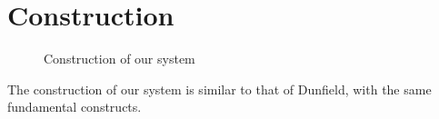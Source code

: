 \documentclass{llncs}
\begin{document}
\section{Construction}
\begin{figure}

\label{fig:cons}
\caption{Construction of our system}
\end{figure}

The construction of our system is similar to that of Dunfield, with the same fundamental constructs.

\begin{figure}

\end{figure}
\begin{figure}

\end{figure}
\begin{figure}

\end{figure}
\begin{figure}

\end{figure}
\end{document}
